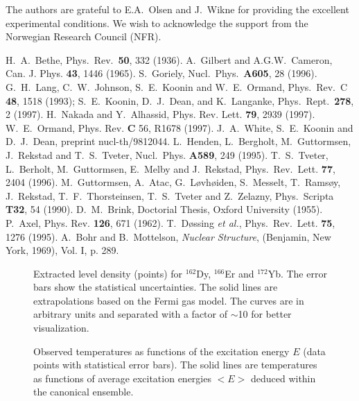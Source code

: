The authors are grateful to E.A.~Olsen and J.~Wikne for providing the
excellent experimental conditions. We wish to acknowledge the support from
the Norwegian Research Council (NFR).

\begin{references}
 H.~A.~Bethe, Phys.~Rev.~{\bf 50}, 332 (1936).
 A.~Gilbert and A.G.W.~Cameron, Can. J. Phys. {\bf 43}, 1446
(1965).  S.~Goriely, Nucl.~Phys.~{\bf A605}, 28 (1996).
 G.~H.~Lang, C.~W.~Johnson, S.~E.~Koonin and W.~E.~Ormand,
Phys.~Rev.~C {\bf 48}, 1518 (1993); S.~E.~Koonin, D.~J.~Dean, and
K.~Langanke, Phys.~Rept.~{\bf 278}, 2 (1997).
 H.~Nakada and Y.~Alhassid, Phys. Rev. Lett. {\bf 79}, 2939
(1997).  W.~E.~Ormand, Phys. Rev. {\bf C} 56, R1678 (1997).
 J.~A.~White, S.~E.~Koonin and D.~J.~Dean, preprint
nucl-th/9812044.  L.~Henden, L.~Bergholt, M.~Guttormsen,
J.~Rekstad and T.~S.~Tveter, Nucl.~Phys. {\bf A589}, 249 (1995).
 T.~S.~Tveter, L.~Berholt, M.~Guttormsen, E.~Melby and J.~Rekstad,
Phys.~Rev.~Lett. {\bf 77}, 2404 (1996).
 M.~Guttormsen, A.~Atac, G.~L{\o}vh{\o}iden, S.~Messelt,
T.~Rams{\o}y, J.~Rekstad, T.~F.~Thorsteinsen, T.~S.~Tveter and Z.~Zelazny,
Phys.~Scripta {\bf T32}, 54 (1990).
 D.~M.~Brink, Doctorial Thesis, Oxford University (1955).
 P.~Axel, Phys. Rev. {\bf 126}, 671 (1962).
 T.~D{\o}ssing {\sl et al.}, Phys.~Rev.~Lett. {\bf 75}, 1276
(1995).
 A.~Bohr and B.~Mottelson, {\em Nuclear Structure}, (Benjamin,
New York, 1969), Vol. I, p. 289. \end{references}


\begin{figure}
\caption{ Extracted level density (points) for $^{162}$Dy, $^{166}$Er and
$^{172}$Yb. The error bars show the statistical uncertainties. The solid
lines are extrapolations based on the Fermi gas model. The curves are in
arbitrary units and separated with a factor of $\sim$10 for better
visualization.} \end{figure}

\begin{figure}
\caption{Observed temperatures as functions of the excitation energy $E$
(data points with statistical error bars). The solid lines are temperatures
as functions of average excitation energies $<E>$ deduced within the
canonical ensemble.}
\end{figure}

